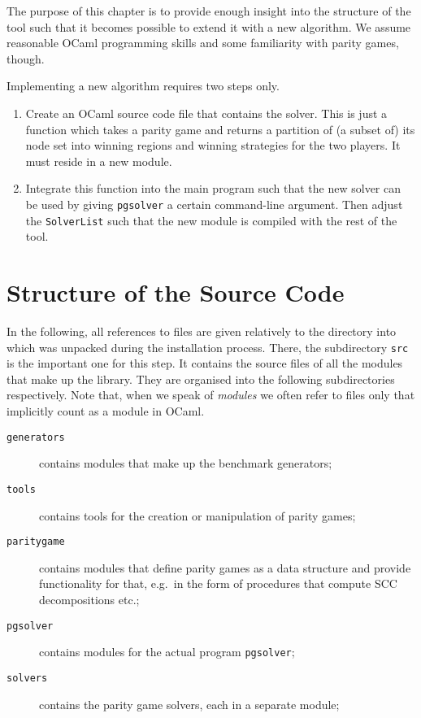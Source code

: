 \label{chp:devguide}

The purpose of this chapter is to provide enough insight into the structure
of the \pgsolver tool such that it becomes possible to extend it with a new algorithm.
We assume reasonable OCaml programming skills and some familiarity with parity games, though.

Implementing a new algorithm requires two steps only.
\begin{enumerate}
\item Create an OCaml source code file that contains the solver. This is just a function
      which takes a parity game and returns a partition of (a subset of) its node set into
      winning regions and winning strategies for the two players. It must reside in a new
      module.
\item Integrate this function into the main program such that the new solver can be used
      by giving \texttt{pgsolver} a certain command-line argument. Then adjust the
      \texttt{SolverList} such that the new module is compiled with the rest of the tool.
\end{enumerate}


\section{Structure of the Source Code}

In the following, all references to files are given relatively to the directory into which
\pgsolver was unpacked during the installation process. There, the subdirectory \texttt{src}
is the important one for this step. It contains the source files of all the modules that
make up the \pgsolver library. They are organised into the following subdirectories respectively.
Note that, when we speak of \emph{modules} we often refer to files only that implicitly count as
a module in OCaml.
\begin{description}
\item[\texttt{generators}] contains modules that make up the benchmark generators;
\item[\texttt{tools}] contains tools for the creation or manipulation of parity games;
\item[\texttt{paritygame}] contains modules that define parity games as a data structure and
     provide functionality for that, e.g.\ in the form of procedures that compute SCC decompositions
     etc.;
\item[\texttt{pgsolver}] contains modules for the actual program \texttt{pgsolver};
\item[\texttt{solvers}] contains the parity game solvers, each in a separate module;
\end{description}

